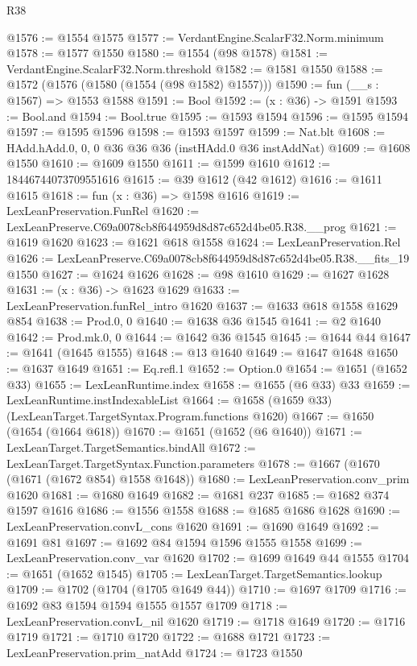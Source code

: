 \begin{lexlean}{R38}
\begin{coremodule}
@1576 := @1554 @1575
@1577 := VerdantEngine.ScalarF32.Norm.minimum
@1578 := @1577 @1550
@1580 := @1554 (@98 @1578)
@1581 := VerdantEngine.ScalarF32.Norm.threshold
@1582 := @1581 @1550
@1588 := @1572 (@1576 (@1580 (@1554 (@98 @1582) @1557)))
@1590 := fun (__s : @1567) => @1553 @1588
@1591 := Bool
@1592 := (x : @36) -> @1591
@1593 := Bool.and
@1594 := Bool.true
@1595 := @1593 @1594
@1596 := @1595 @1594
@1597 := @1595 @1596
@1598 := @1593 @1597
@1599 := Nat.blt
@1608 := HAdd.hAdd.{0, 0, 0} @36 @36 @36 (instHAdd.{0} @36 instAddNat)
@1609 := @1608 @1550
@1610 := @1609 @1550
@1611 := @1599 @1610
@1612 := 18446744073709551616
@1615 := @39 @1612 (@42 @1612)
@1616 := @1611 @1615
@1618 := fun (x : @36) => @1598 @1616
@1619 := LexLeanPreservation.FunRel
@1620 := LexLeanPreserve.C69a0078cb8f644959d8d87c652d4be05.R38.__prog
@1621 := @1619 @1620
@1623 := @1621 @618 @1558
@1624 := LexLeanPreservation.Rel
@1626 := LexLeanPreserve.C69a0078cb8f644959d8d87c652d4be05.R38.__fits_19 @1550
@1627 := @1624 @1626
@1628 := @98 @1610
@1629 := @1627 @1628
@1631 := (x : @36) -> @1623 @1629
@1633 := LexLeanPreservation.funRel_intro @1620
@1637 := @1633 @618 @1558 @1629 @854
@1638 := Prod.{0, 0}
@1640 := @1638 @36 @1545
@1641 := @2 @1640
@1642 := Prod.mk.{0, 0}
@1644 := @1642 @36 @1545
@1645 := @1644 @44
@1647 := @1641 (@1645 @1555)
@1648 := @13 @1640
@1649 := @1647 @1648
@1650 := @1637 @1649
@1651 := Eq.refl.{1}
@1652 := Option.{0}
@1654 := @1651 (@1652 @33)
@1655 := LexLeanRuntime.index
@1658 := @1655 (@6 @33) @33
@1659 := LexLeanRuntime.instIndexableList
@1664 := @1658 (@1659 @33) (LexLeanTarget.TargetSyntax.Program.functions @1620)
@1667 := @1650 (@1654 (@1664 @618))
@1670 := @1651 (@1652 (@6 @1640))
@1671 := LexLeanTarget.TargetSemantics.bindAll
@1672 := LexLeanTarget.TargetSyntax.Function.parameters
@1678 := @1667 (@1670 (@1671 (@1672 @854) @1558 @1648))
@1680 := LexLeanPreservation.conv_prim @1620
@1681 := @1680 @1649
@1682 := @1681 @237
@1685 := @1682 @374 @1597 @1616
@1686 := @1556 @1558
@1688 := @1685 @1686 @1628
@1690 := LexLeanPreservation.convL_cons @1620
@1691 := @1690 @1649
@1692 := @1691 @81
@1697 := @1692 @84 @1594 @1596 @1555 @1558
@1699 := LexLeanPreservation.conv_var @1620
@1702 := @1699 @1649 @44 @1555
@1704 := @1651 (@1652 @1545)
@1705 := LexLeanTarget.TargetSemantics.lookup
@1709 := @1702 (@1704 (@1705 @1649 @44))
@1710 := @1697 @1709
@1716 := @1692 @83 @1594 @1594 @1555 @1557 @1709
@1718 := LexLeanPreservation.convL_nil @1620
@1719 := @1718 @1649
@1720 := @1716 @1719
@1721 := @1710 @1720
@1722 := @1688 @1721
@1723 := LexLeanPreservation.prim_natAdd
@1724 := @1723 @1550

\end{coremodule}
\end{lexlean}
